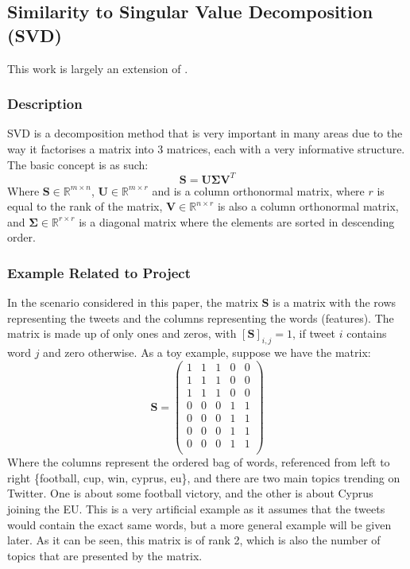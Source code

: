 \documentclass[11pt,a4paper]{article}
\begin{document}
\subsection{Similarity to Singular Value Decomposition (SVD)}
This work is largely an extension of \cite{lecture_svd}.

\subsubsection{Description}
SVD is a decomposition method that is very important in many areas due to the way it factorises a matrix into 3 matrices, each with a very informative structure. The basic concept is as such:
\begin{equation}
\mathbf{S} = \mathbf{U}\mathbf{\Sigma}\mathbf{V}^T
\end{equation}
Where $\mathbf{S} \in \mathbb{R}^{m \times n}$,  $\mathbf{U} \in \mathbb{R}^{m \times r}$ and is a column orthonormal matrix, where $r$ is equal to the rank of the matrix,  $\mathbf{V} \in \mathbb{R}^{n \times r}$ is also a column orthonormal matrix, and  $\mathbf{\Sigma} \in \mathbb{R}^{r \times r}$ is a diagonal matrix where the elements are sorted in descending order.

\subsubsection{Example Related to Project}
In the scenario considered in this paper, the matrix $\mathbf{S}$ is a matrix with the rows representing the tweets and the columns representing the words (features). The matrix is made up of only ones and zeros, with $[\mathbf{S}]_{i,j} = 1$, if tweet $i$ contains word $j$ and zero otherwise. As a toy example, suppose we have the matrix:
\begin{equation}
\mathbf{S} = 
\begin{pmatrix}
1 & 1 & 1 & 0 & 0\\
1 & 1 & 1 & 0 & 0\\
1 & 1 & 1 & 0 & 0\\
0 & 0 & 0 & 1 & 1\\
0 & 0 & 0 & 1 & 1\\
0 & 0 & 0 & 1 & 1\\
0 & 0 & 0 & 1 & 1\\
\end{pmatrix}
\end{equation}
Where the columns represent the ordered bag of words, referenced from left to right \{football, cup, win, cyprus, eu\}, and there are two main topics trending on Twitter. One is about some football victory, and the other is about Cyprus joining the EU. This is a very artificial example as it assumes that the tweets would contain the exact same words, but a more general example will be given later. As it can be seen, this matrix is of rank 2, which is also the number of topics that are presented by the matrix. 
\end{document}

